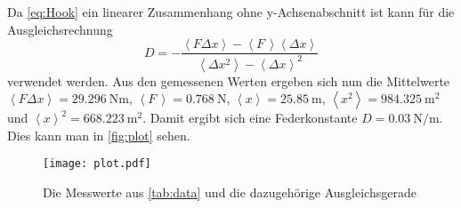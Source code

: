Da \autoref{eq:Hook} ein linearer Zusammenhang ohne y-Achsenabschnitt ist kann für die Ausgleichsrechnung
\begin{equation}
  \label{eq:Lin-Ausgleich}
  D = - \frac
  {\left< F \Delta x \right> - \left< F \, \right> \left< \Delta x \right>}
  {\left< \Delta x^2 \right> - \left< \Delta x \right> ^2}
\end{equation}
verwendet werden.
Aus den gemessenen Werten ergeben sich nun die Mittelwerte $\left< F \Delta x \right> = \SI{29.296}{\newton\meter}$, $\left< F \, \right> = \SI{0.768}{\newton}$, $\left< x \right> = \SI{25.85}{\meter}$, $\left< x^2 \right> = \SI{984.325}{\meter\squared}$ und $\left< x \right> ^2 = \SI{668.223}{\meter\squared}$.
Damit ergibt sich eine Federkonstante $D=\SI{0.03}{\newton\per\meter}$.
Dies kann man in \autoref{fig:plot} sehen.

\begin{figure}
  \centering
  \texttt{[image: plot.pdf]}
  \caption{Die Messwerte aus \autoref{tab:data} und die dazugehörige Ausgleichsgerade}
  \label{fig:plot}
\end{figure}

